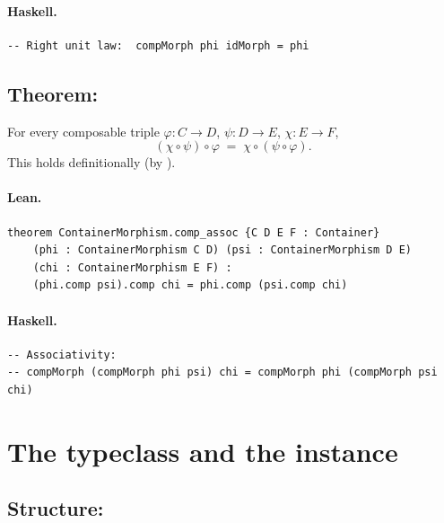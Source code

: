 \documentclass[11pt,a4paper]{article}
\begin{document}
\paragraph{Haskell.}
\begin{lstlisting}[style=haskell]
-- Right unit law:  compMorph phi idMorph = phi
\end{lstlisting}


\subsection{Theorem: }

\begin{thm}[Associativity]
For every composable triple $\varphi : C \to D$, $\psi : D \to E$,
$\chi : E \to F$,
\[
  (\chi \circ \psi) \circ \varphi \;=\; \chi \circ (\psi \circ \varphi).
\]
This holds definitionally (by ).
\end{thm}

\paragraph{Lean.}
\begin{lstlisting}[style=lean]
theorem ContainerMorphism.comp_assoc {C D E F : Container}
    (phi : ContainerMorphism C D) (psi : ContainerMorphism D E)
    (chi : ContainerMorphism E F) :
    (phi.comp psi).comp chi = phi.comp (psi.comp chi)
\end{lstlisting}

\paragraph{Haskell.}
\begin{lstlisting}[style=haskell]
-- Associativity:
-- compMorph (compMorph phi psi) chi = compMorph phi (compMorph psi chi)
\end{lstlisting}


\section{The  typeclass and the  instance}

\subsection{Structure: }
\end{document}
